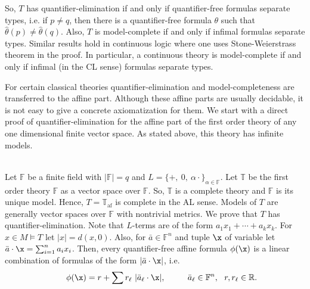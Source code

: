 \documentclass[12pt]{article}
\def\a{\bar{a}}\def\b{\bar{b}}\def\c{\bar{c}}
\def\Rn{\mathbb R}
\begin{document}
So, $T$ has quantifier-elimination if and only if quantifier-free formulas separate types,
i.e. if $p\neq q$, then there is a quantifier-free formula $\theta$ such that $\hat\theta(p)\neq\hat\theta(q)$.
Also, $T$ is model-complete if and only if infimal formulas separate types.
Similar results hold in continuous logic where one uses Stone-Weierstrass theorem in the proof.
In particular, a continuous theory is model-complete if and only if infimal (in the CL sense) formulas separate types.

For certain classical theories quantifier-elimination and model-completeness are transferred to the affine part.
Although these affine parts are usually decidable, it is not easy to give a concrete axiomatization for them.
We start with a direct proof of quantifier-elimination for the affine part of the first order theory of any
one dimensional finite vector space. As stated above, this theory has infinite models.
\bigskip

\\
Let $\mathbb F$ be a finite field with $|\mathbb F|=q$ and $L=\{+,\ 0,\ \alpha\cdot\}_{\alpha\in\mathbb F}$.
Let $\mathbb{T}$ be the first order theory $\mathbb F$ as a vector space over $\mathbb F$.
So, $\mathbb T$ is a complete theory and $\mathbb F$ is its unique model.
Hence, $T=\mathbb{T}_{\textrm{af}}$ is complete in the AL sense.
Models of $T$ are generally vector spaces over $\mathbb F$ with nontrivial metrics.
We prove that $T$ has quantifier-elimination. Note that $L$-terms are of the form $a_1x_1+\cdots+a_kx_k$.
For $x\in M\vDash T$ let $|x|=d(x,0)$. Also, for $\a\in\mathbb F^n$ and tuple $\x$ of variable
let $\a\cdot\x=\sum_{i=1}^n a_ix_i$.
Then, every quantifier-free affine formula $\phi(\x)$ is a linear combination
of formulas of the form $|\a\cdot\x|$, i.e.
$$\ \ \ \ \ \phi(\x)=r+\sum r_\ell\ |\a_\ell\cdot\x|,
\ \ \ \ \ \ \ \ \a_\ell\in\mathbb F^n, \ \ r, r_\ell\in\Rn.$$
\end{document}
